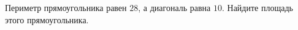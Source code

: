 \begin{ex}
	\begin{condition}
		Периметр прямоугольника равен \( 28 \), а диагональ равна \( 10 \). Найдите площадь этого прямоугольника.
	\end{condition}
\end{ex}